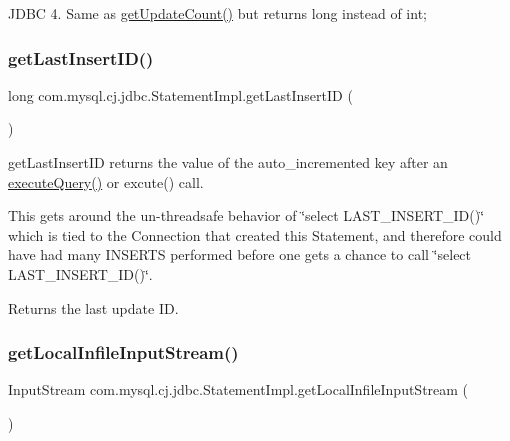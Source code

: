 J\+D\+BC 4. Same as \mbox{\hyperlink{classcom_1_1mysql_1_1cj_1_1jdbc_1_1_statement_impl_abb1d31f01f22e76a4d2a03c26905cb2e}{get\+Update\+Count()}} but returns long instead of int; \mbox{\label{classcom_1_1mysql_1_1cj_1_1jdbc_1_1_statement_impl_af48b4bdf41d529d92def194cbe611acf}} 
\subsubsection{\texorpdfstring{get\+Last\+Insert\+I\+D()}{getLastInsertID()}}
{\footnotesize\ttfamily long com.\+mysql.\+cj.\+jdbc.\+Statement\+Impl.\+get\+Last\+Insert\+ID (\begin{DoxyParamCaption}{ }\end{DoxyParamCaption})}

get\+Last\+Insert\+ID returns the value of the auto\+\_\+incremented key after an \mbox{\hyperlink{classcom_1_1mysql_1_1cj_1_1jdbc_1_1_statement_impl_ad8bdf41d3e788681fe1adcf961b176ef}{execute\+Query()}} or excute() call.

This gets around the un-\/threadsafe behavior of \char`\"{}select L\+A\+S\+T\+\_\+\+I\+N\+S\+E\+R\+T\+\_\+\+I\+D()\char`\"{} which is tied to the Connection that created this Statement, and therefore could have had many I\+N\+S\+E\+R\+TS performed before one gets a chance to call \char`\"{}select L\+A\+S\+T\+\_\+\+I\+N\+S\+E\+R\+T\+\_\+\+I\+D()\char`\"{}. 

\begin{DoxyReturn}{Returns}
the last update ID. 
\end{DoxyReturn}
\mbox{\label{classcom_1_1mysql_1_1cj_1_1jdbc_1_1_statement_impl_a52f35ba4029870388a69d493851e726a}} 
\subsubsection{\texorpdfstring{get\+Local\+Infile\+Input\+Stream()}{getLocalInfileInputStream()}}
{\footnotesize\ttfamily Input\+Stream com.\+mysql.\+cj.\+jdbc.\+Statement\+Impl.\+get\+Local\+Infile\+Input\+Stream (\begin{DoxyParamCaption}{ }\end{DoxyParamCaption})}

